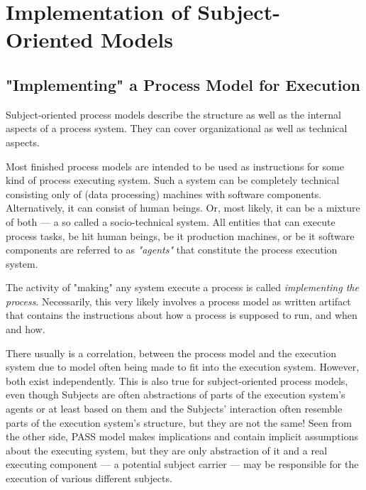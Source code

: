 

\chapter{Implementation of Subject-Oriented Models}

\section{"Implementing" a Process Model for Execution}

Subject-oriented process models describe the structure as well as the internal aspects of a process system. They can cover organizational as well as technical aspects. 

Most finished process models are intended to be used as instructions for some kind of process executing system. Such a system can be completely technical consisting only of (data processing) machines with software components. Alternatively, it can consist of human beings. Or, most likely, it can be a mixture of both --- a so called a socio-technical system. All entities that can execute process tasks, be hit human beings, be it production machines, or be it software components are referred to as \textit{"agents"} that constitute the process execution system.

The activity of "making" any system execute a process is called \textit{implementing the process}. Necessarily, this very likely involves a process model as written artifact that contains the instructions about how a process is supposed to run, and when and how.

There usually is a correlation, between the process model and the execution system due to model often being made to fit into the execution system. However, both exist independently. This is also true for subject-oriented process models, even though Subjects are often abstractions of parts of the execution system's agents or at least based on them and the Subjects' interaction often resemble parts of the execution system's structure, but they are not the same! Seen from the other side, PASS model makes implications and contain implicit assumptions about the executing system, but they are only abstraction of it and a real executing component --- a potential subject carrier --- may be responsible for the execution of various different subjects.

